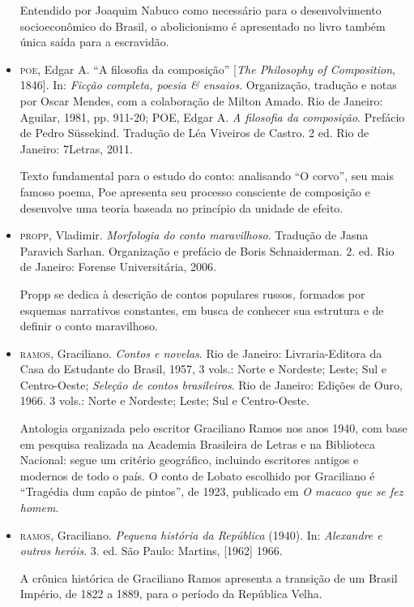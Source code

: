 \documentclass[11pt]{extarticle}
\begin{document}
\begin{itemize}
Entendido por Joaquim Nabuco como necessário para o desenvolvimento socioeconômico 
do Brasil, o abolicionismo é apresentado no livro também única saída para a escravidão.

\item \textsc{poe}, Edgar A. ``A filosofia da composição'' {[}\emph{The Philosophy of
Composition}, 1846{]}. In: \emph{Ficção completa, poesia \& ensaios}.
Organização, tradução e notas por Oscar Mendes, com a colaboração de
Milton Amado. Rio de Janeiro: Aguilar, 1981, pp. 911-20; POE, Edgar A.
\emph{A filosofia da composição}. Prefácio de Pedro Süssekind. Tradução
de Léa Viveiros de Castro. 2 ed. Rio de Janeiro: 7Letras, 2011. 

Texto fundamental para o estudo do conto: analisando ``O corvo'', seu mais
famoso poema, Poe apresenta seu processo consciente de composição e
desenvolve uma teoria baseada no princípio da unidade de efeito.

\item \textsc{propp}, Vladimir. \emph{Morfologia do conto maravilhoso}. Tradução de
Jasna Paravich Sarhan. Organização e prefácio de Boris Schnaiderman. 2.
ed. Rio de Janeiro: Forense Universitária, 2006. 

Propp se dedica à descrição de contos populares russos, formados por esquemas narrativos
constantes, em busca de conhecer sua estrutura e de definir o conto
maravilhoso.

\item \textsc{ramos}, Graciliano. \emph{Contos e novelas}. Rio de Janeiro:
Livraria-Editora da Casa do Estudante do Brasil, 1957, 3 vols.: Norte e
Nordeste; Leste; Sul e Centro-Oeste; \emph{Seleção de contos
brasileiros}. Rio de Janeiro: Edições de Ouro, 1966. 3 vols.: Norte e
Nordeste; Leste; Sul e Centro-Oeste. 

Antologia organizada pelo escritor Graciliano Ramos nos anos 1940, com base em pesquisa 
realizada na Academia Brasileira de Letras e na Biblioteca Nacional: segue um
critério geográfico, incluindo escritores antigos e modernos de todo o
país. O conto de Lobato escolhido por Graciliano é ``Tragédia dum capão
de pintos'', de 1923, publicado em \emph{O macaco que se fez homem}.

\item \textsc{ramos}, Graciliano. \emph{Pequena história da República} (1940). In:
\emph{Alexandre e outros heróis}. 3. ed. São Paulo: Martins, {[}1962{]}
1966.

A crônica histórica de Graciliano Ramos apresenta a transição de um Brasil Império, 
de 1822 a 1889, para o período da República Velha.


\end{itemize}
\end{document}
